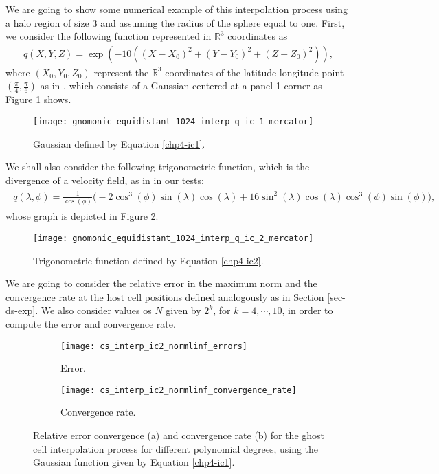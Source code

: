 We are going to show some numerical example of this interpolation process using a halo region of size 3 and 
assuming the radius of the sphere equal to one.
First, we consider the following function represented in $\mathbb{R}^3$ coordinates as
\begin{align}
		\label{chp4-ic1}
		q(X,Y,Z) = \exp(-10((X-X_0)^2+(Y-Y_0)^2+(Z-Z_0)^2)),
\end{align}
where $(X_0,Y_0,Z_0)$ represent the $\mathbb{R}^3$ coordinates of the latitude-longitude point
$(\frac{\pi}{4},\frac{\pi}{6})$ as in \citet{zerroukat:2022}, which consists of a Gaussian centered 
at a panel 1 corner as Figure \ref{chp4-cs-ic1} shows.
\begin{figure}[!htb]
	\centering
	\texttt{[image: gnomonic\_equidistant\_1024\_interp\_q\_ic\_1\_mercator]}
	\caption{Gaussian defined by Equation \eqref{chp4-ic1}.}
	\label{chp4-cs-ic1}
\end{figure}

We shall also consider the following trigonometric function, which is the divergence of a velocity field,
as in \citet{peixoto:13} in our tests:
\begin{align}
	\label{chp4-ic2}
	\begin{split}
	q(\lambda, \phi) = \frac{1}{\cos(\phi)}\bigg(-2\cos^3(\phi) \sin(\lambda) \cos(\lambda)
	+16\sin^2(\lambda)\cos(\lambda)\cos^3(\phi)\sin(\phi)\bigg),
	\end{split}
\end{align}
whose graph is depicted in Figure \ref{chp4-cs-ic2}.
\begin{figure}[!htb]
	\centering
	\texttt{[image: gnomonic\_equidistant\_1024\_interp\_q\_ic\_2\_mercator]}
	\caption{Trigonometric function defined by Equation \eqref{chp4-ic2}.}
	\label{chp4-cs-ic2}
\end{figure}

We are going to consider the relative error in the maximum norm and the convergence rate 
at the host cell positions defined analogously as in Section \ref{sec-ds-exp}. 
We also consider values os $N$ given by $2^k$, for $k=4, \cdots, 10$, in order to compute the error and convergence rate.
\begin{figure}[!htb]
	\centering
	\begin{subfigure}{0.45\textwidth}
		\centering
		\texttt{[image: cs\_interp\_ic2\_normlinf\_errors]}
		\caption{Error.\label{chp4-exp1-error}}
	\end{subfigure}
	\begin{subfigure}{0.45\textwidth}
		\centering
		\texttt{[image: cs\_interp\_ic2\_normlinf\_convergence\_rate]}
		\caption{Convergence rate.\label{chp4-exp1-CR}}
	\end{subfigure}
	\caption{Relative error convergence (a) and convergence rate (b) for the ghost cell interpolation process for different
		polynomial degrees, using the Gaussian function given by Equation \eqref{chp4-ic1}.\label{chp4-exp1}}
\end{figure}


